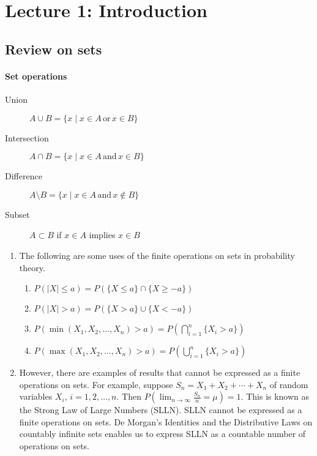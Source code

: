 \chapter{Lecture 1: Introduction}

\section{Review on sets}
\subsubsection{Set operations}

\begin{description}
\item [Union] $A\cup B=\{x \mid x\in A\, \mathrm{or}\, x\in B \}$
\item[Intersection] $A\cap B= \{x \mid x\in A\, \mathrm{and}\, x\in B \}$
\item[Difference] $A\setminus B= \{x \mid x\in A\, \mathrm{and}\, x\notin B \}$
\item[Subset] $A\subset B$ if $x\in A$ implies $x\in B$
\end{description}

\begin{notes}
\begin{enumerate}
\item The following are some uses of the finite operations on sets in probability theory.
\begin{enumerate}
	\item $P(\lvert X\rvert \leq a)=P(\{X\leq a\}\cap \{X\geq -a\})$
	\item $P(\lvert X\rvert > a)=P(\{X> a\}\cup \{X< -a\})$
	\item $P(\min(X_1,X_2,\ldots,X_n)>a)=P(\bigcap_{i=1}^n\{X_i>a \})$
	\item $P(\max(X_1,X_2,\ldots,X_n)>a)=P(\bigcup_{i=1}^n\{X_i>a \})$
\end{enumerate}
\item However, there are examples of results that cannot be expressed as a finite operations on sets. For example, suppose $S_n=X_1+X_2+\cdots+X_n$ of random variables $X_i$, $i=1,2,\ldots, n$. Then $P(\lim_{n\to\infty}\frac{S_n}{n}=\mu)=1$. This is known as the Strong Law of Large Numbers (SLLN). SLLN cannot be expressed as a finite operations on sets. De Morgan's Identities and the Distributive Laws on countably infinite sets enables us to express SLLN as a countable number of operations on sets.
\end{enumerate}

\end{notes}

